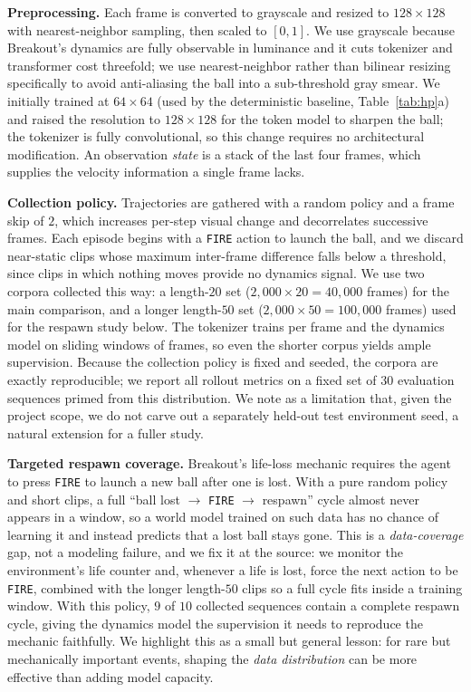 \documentclass[10pt,twocolumn,letterpaper]{article}
\begin{document}
\textbf{Preprocessing.} Each frame is converted to grayscale and resized to
$128\times128$ with nearest-neighbor sampling, then scaled to $[0,1]$. We use
grayscale because Breakout's dynamics are fully observable in luminance and it
cuts tokenizer and transformer cost threefold; we use nearest-neighbor rather
than bilinear resizing specifically to avoid anti-aliasing the ball into a
sub-threshold gray smear. We initially trained at $64\times64$ (used by the
deterministic baseline, Table~\ref{tab:hp}a) and raised the resolution to
$128\times128$ for the token model to sharpen the ball; the tokenizer is fully
convolutional, so this change requires no architectural modification. An
observation \emph{state} is a stack of the last four frames, which supplies the
velocity information a single frame lacks.

\textbf{Collection policy.} Trajectories are gathered with a random policy and a
frame skip of $2$, which increases per-step visual change and decorrelates
successive frames. Each episode begins with a \texttt{FIRE} action to launch the
ball, and we discard near-static clips whose maximum inter-frame difference falls
below a threshold, since clips in which nothing moves provide no dynamics
signal. We use two corpora collected this way: a length-$20$ set
($2{,}000\times20=40{,}000$ frames) for the main comparison, and a longer
length-$50$ set ($2{,}000\times50=100{,}000$ frames) used for the respawn study
below. The tokenizer trains per frame and the dynamics model on sliding windows
of frames, so even the shorter corpus yields ample supervision. Because the
collection policy is fixed and seeded, the corpora are exactly reproducible; we
report all rollout metrics on a fixed set of $30$ evaluation sequences primed
from this distribution. We note as a limitation that, given the project scope,
we do not carve out a separately held-out test environment seed, a
natural extension for a fuller study.

\textbf{Targeted respawn coverage.} Breakout's life-loss mechanic requires the
agent to press \texttt{FIRE} to launch a new ball after one is lost. With a pure
random policy and short clips, a full
``ball lost $\rightarrow$ \texttt{FIRE} $\rightarrow$ respawn'' cycle almost
never appears in a window, so a world model trained on such data has no chance of
learning it and instead predicts that a lost ball stays gone. This is a
\emph{data-coverage} gap, not a modeling failure, and we fix it at the source: we
monitor the environment's life counter and, whenever a life is lost, force the
next action to be \texttt{FIRE}, combined with the longer length-$50$ clips so a
full cycle fits inside a training window. With this policy, $9$ of $10$ collected
sequences contain a complete respawn cycle, giving the dynamics model the
supervision it needs to reproduce the mechanic faithfully. We highlight this as a
small but general lesson: for rare but mechanically important events, shaping the
\emph{data distribution} can be more effective than adding model capacity.
\end{document}
